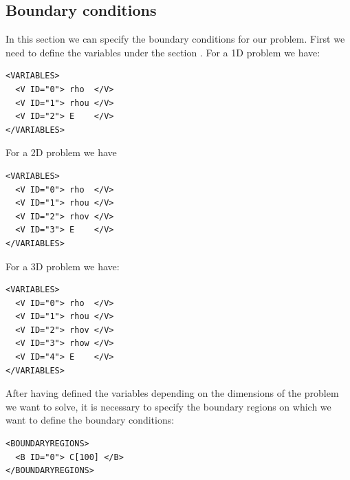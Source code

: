 \subsection*{Boundary conditions}
In this section we can specify the boundary conditions for our problem.
First we need to define the variables under the section .
For a 1D problem we have:
\begin{lstlisting}[style=XmlStyle]
<VARIABLES>
  <V ID="0"> rho  </V>
  <V ID="1"> rhou </V>
  <V ID="2"> E    </V>
</VARIABLES>
\end{lstlisting}

For a 2D problem we have
\begin{lstlisting}[style=XmlStyle]
<VARIABLES>
  <V ID="0"> rho  </V>
  <V ID="1"> rhou </V>
  <V ID="2"> rhov </V>
  <V ID="3"> E    </V>
</VARIABLES>
\end{lstlisting}

For a 3D problem we have:
\begin{lstlisting}[style=XmlStyle]
<VARIABLES>
  <V ID="0"> rho  </V>
  <V ID="1"> rhou </V>
  <V ID="2"> rhov </V>
  <V ID="3"> rhow </V>
  <V ID="4"> E    </V>
</VARIABLES>
\end{lstlisting}

After having defined the variables depending on the dimensions of the problem we want to solve,
it is necessary to specify the boundary regions on which we want to define the boundary conditions:
\begin{lstlisting}[style=XmlStyle]
<BOUNDARYREGIONS>
  <B ID="0"> C[100] </B>
</BOUNDARYREGIONS>
\end{lstlisting}

